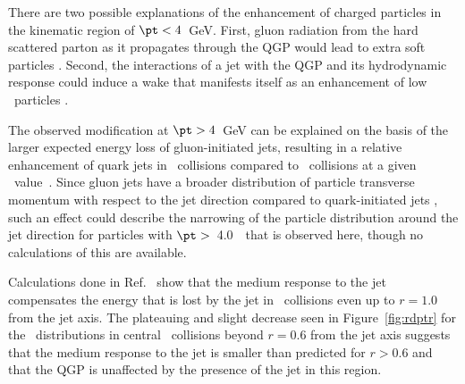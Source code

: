 There are two possible explanations of the enhancement of charged particles in the kinematic region of \mbox{$\pt < 4$ GeV}.
First, gluon radiation from the hard scattered parton as it propagates through the QGP would lead to extra soft particles \cite{Chien:2015vja, Kang:2017frl}.
Second, the interactions of a jet with the QGP and its hydrodynamic response could induce a wake that manifests itself as an enhancement of low \pt\ particles \cite{Tachibana:2017syd}.

The observed modification at \mbox{$\pt > 4$ GeV} can be explained on the basis of the larger expected energy loss of gluon-initiated jets, resulting in a relative enhancement of quark jets in \pbpb\ collisions compared to \pp\ collisions at a given \ptjet\ value~\cite{Aaboud:2018hpb, Spousta:2015fca}.
Since gluon jets have a broader distribution of particle transverse momentum with respect to the jet direction compared to quark-initiated jets \cite{OPAL:1995ab}, such an effect could describe the narrowing of the particle distribution around the jet direction for particles with $\pt >$~4.0~\GeV\ that is observed here, though no calculations of this are available.

Calculations done in Ref.~\cite{Tachibana:2017syd} show that the medium response to the jet compensates the energy that is lost by the jet in \pbpb\ collisions even up to $r = 1.0$ from the jet axis.
The plateauing and slight decrease seen in Figure~\ref{fig:rdptr} for the \RDptr\ distributions in central \pbpb\ collisions beyond $r = 0.6$ from the jet axis suggests that the medium response to the jet is smaller than predicted for $r > 0.6$ and that the QGP is unaffected by the presence of the jet in this region.



\FloatBarrier
